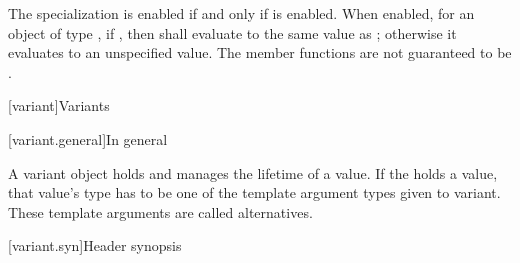 \begin{itemdescr}
\pnum
The specialization  is enabled
if and only if  is enabled.
When enabled, for an object  of type ,
if , then 
shall evaluate to the same value as ;
otherwise it evaluates to an unspecified value.
The member functions are not guaranteed to be .
\end{itemdescr}


[variant]{Variants}

[variant.general]{In general}

\pnum
A variant object holds and manages the lifetime of a value.
If the  holds a value, that value's type has to be one
of the template argument types given to variant.
These template arguments are called alternatives.

[variant.syn]{Header  synopsis}
%

